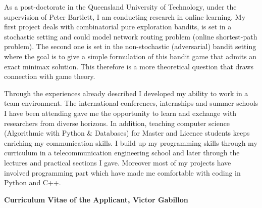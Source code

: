 As a post-doctorate in the Queensland University of Technology, under the supervision of Peter Bartlett, I am conducting research in online learning.  My first project deals with  combinatorial pure exploration bandits, is set in a stochastic setting and could model network routing problem (online shortest-path problem). The second one is set in the non-stochastic (adversarial)  bandit setting where the goal is to give a simple formulation of this bandit game that admits an exact minimax solution. This therefore is a more theoretical question that draws connection with game theory.

Through the experiences already described I developed my ability to work in a team environment. The international conferences, internships and summer schools I have been attending gave me the opportunity to learn and exchange with researchers from diverse horizons. In addition, teaching computer science (Algorithmic with Python \& Databases) for Master and Licence students keeps enriching my communication skills. I build up my programming skills through my curriculum in a telecommunication engineering school and later through the lectures and practical sections I gave. Moreover most of my projects have involved programming part which have made me comfortable with coding in Python and  C++.

 \begin{center} \textbf{Curriculum Vitae of the Applicant,  Victor Gabillon}  \end{center}
 
